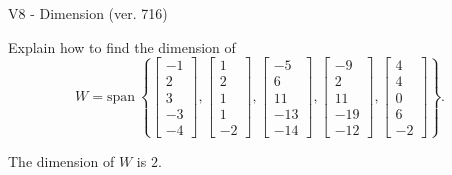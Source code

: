 \begin{exercise}
  \begin{exerciseTitle}V8 - Dimension (ver. 716)\end{exerciseTitle}
  \begin{exerciseStatement}
    Explain how to find the dimension of 
\[W=\mathrm{span}\ \left\{\left[\begin{array}{r}
-1 \\
2 \\
3 \\
-3 \\
-4
\end{array}\right] , \left[\begin{array}{r}
1 \\
2 \\
1 \\
1 \\
-2
\end{array}\right] , \left[\begin{array}{r}
-5 \\
6 \\
11 \\
-13 \\
-14
\end{array}\right] , \left[\begin{array}{r}
-9 \\
2 \\
11 \\
-19 \\
-12
\end{array}\right] , \left[\begin{array}{r}
4 \\
4 \\
0 \\
6 \\
-2
\end{array}\right]\right\}.\]



  \end{exerciseStatement}
  \begin{exerciseAnswer}
   The dimension of \(W\) is  \(2\).
  


  \end{exerciseAnswer}
\end{exercise}